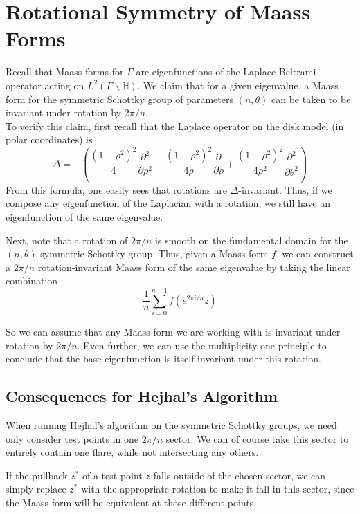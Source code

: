 \documentclass[]{article}
\begin{document}
\clearpage

\section*{Rotational Symmetry of Maass Forms}

Recall that Maass forms for $\Gamma$ are eigenfunctions of the Laplace-Beltrami operator acting on $L^2(\Gamma\backslash\mathbb{H})$.
We claim that for a given eigenvalue, a Maass form for the symmetric Schottky group of parameters $(n, \theta)$ can be taken to be invariant under rotation by $2\pi/n$.
\\

To verify this claim, first recall that the Laplace operator on the disk model (in polar coordinates) is
$$
\Delta = -\left(\frac{(1 - \rho^2)^2}{4}\frac{\partial^2}{\partial\rho^2} +
\frac{(1 - \rho^2)^2}{4\rho}\frac{\partial}{\partial\rho} +
\frac{(1 - \rho^2)^2}{4\rho^2}\frac{\partial^2}{\partial\theta^2}\right)
$$
From this formula, one easily sees that rotations are $\Delta$-invariant.
Thus, if we compose any eigenfunction of the Laplacian with a rotation, we still have an eigenfunction of the same eigenvalue.

Next, note that a rotation of $2\pi/n$ is smooth on the fundamental domain for the $(n, \theta)$ symmetric Schottky group.
Thus, given a Maass form $f$, we can construct a $2\pi/n$ rotation-invariant Maass form of the same eigenvalue by taking the linear combination
$$
\frac{1}{n}\sum_{i = 0}^{n - 1}f\left(e^{2\pi i/n} z\right)
$$

So we can assume that any Maass form we are working with is invariant under rotation by $2\pi/n$.
Even further, we can use the multiplicity one principle to conclude that the base eigenfunction is itself invariant under this rotation.

\subsection*{Consequences for Hejhal's Algorithm}

When running Hejhal's algorithm on the symmetric Schottky groups, we need only consider test points in one $2\pi/n$ sector.
We can of course take this sector to entirely contain one flare, while not intersecting any others.

If the pullback $z^*$ of a test point $z$ falls outside of the chosen sector, we can simply replace $z^*$ with the appropriate rotation to make it fall in this sector, since the Maass form will be equivalent at those different points.
\end{document}

